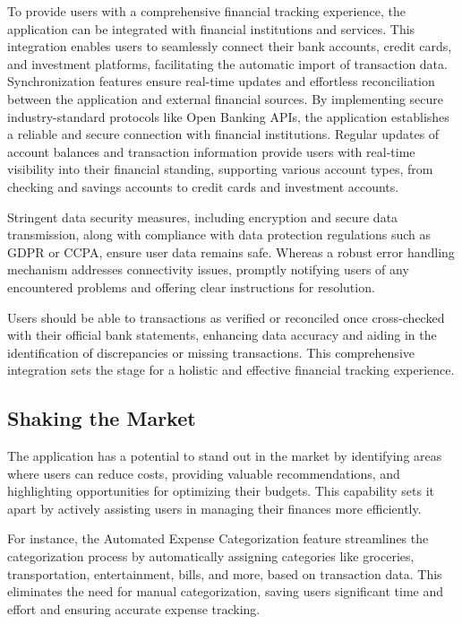To provide users with a comprehensive financial tracking experience, the application can be integrated with financial 
institutions and services. This integration enables users to seamlessly connect their bank accounts, credit cards, and 
investment platforms, facilitating the automatic import of transaction data. Synchronization features ensure real-time 
updates and effortless reconciliation between the application and external financial sources. By implementing secure 
industry-standard protocols like Open Banking APIs, the application establishes a reliable and secure connection with 
financial institutions. Regular updates of account balances and transaction information provide users with real-time 
visibility into their financial standing, supporting various account types, from checking and savings accounts to 
credit cards and investment accounts. 

Stringent data security measures, including encryption and secure data transmission, along with compliance with data 
protection regulations such as GDPR or CCPA, ensure user data remains safe. Whereas a robust error handling mechanism 
addresses connectivity issues, promptly notifying users of any encountered problems and offering clear instructions for 
resolution. 

Users should be able to transactions as verified or reconciled once cross-checked with their official bank statements, 
enhancing data accuracy and aiding in the identification of discrepancies or missing transactions. This comprehensive 
integration sets the stage for a holistic and effective financial tracking experience.


\subsection{Shaking the Market}

The application has a potential to stand out in the market by identifying areas where users can reduce costs, 
providing valuable recommendations, and highlighting opportunities for optimizing their budgets. This capability 
sets it apart by actively assisting users in managing their finances more efficiently.

For instance, the Automated Expense Categorization feature streamlines the categorization process by automatically 
assigning categories like groceries, transportation, entertainment, bills, and more, based on transaction data. This 
eliminates the need for manual categorization, saving users significant time and effort and ensuring accurate expense 
tracking.

